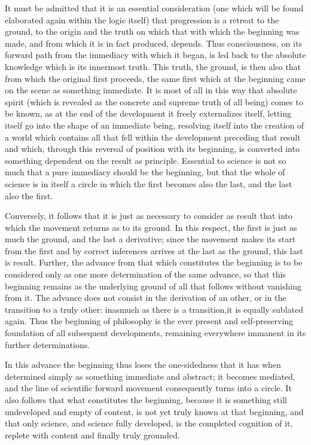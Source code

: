 It must be admitted that it is an essential consideration
(one which will be found elaborated again within the logic itself)
that progression is a retreat to the ground,
to the origin and the truth on which
that with which the beginning was made,
and from which it is in fact produced, depends.
Thus consciousness, on its forward path from
the immediacy with which it began,
is led back to the absolute knowledge
which is its innermost truth.
This truth, the ground, is then also
that from which the original first proceeds,
the same first which at the beginning
came on the scene as something immediate.
It is most of all in this way that absolute spirit
(which is revealed as the concrete and supreme truth of all being)
comes to be known, as at the end of the development
it freely externalizes itself,
letting itself go into the shape of an immediate being,
resolving itself into the creation of a world
which contains all that fell within the development
preceding that result and which,
through this reversal of position with its beginning,
is converted into something dependent on the result as principle.
Essential to science is not so much that
a pure immediacy should be the beginning,
but that the whole of science is in itself a circle
in which the first becomes also the last,
and the last also the first.

Conversely, it follows that it is
just as necessary to consider as result
that into which the movement returns as to its ground.
In this respect, the first is just as much the ground,
and the last a derivative;
since the movement makes its start from the first
and by correct inferences arrives at the last
as the ground, this last is result.
Further, the advance from that which constitutes the beginning is
to be considered only as one more determination of the same advance,
so that this beginning remains as the underlying ground of
all that follows without vanishing from it.
The advance does not consist in the derivation of an other,
or in the transition to a truly other:
inasmuch as there is a transition,it is equally sublated again.
Thus the beginning of philosophy is the ever present
and self-preserving foundation of all subsequent developments,
remaining everywhere immanent in its further determinations.

In this advance the beginning thus loses the one-sidedness
that it has when determined simply as something immediate and abstract;
it becomes mediated, and the line of scientific forward movement
consequently turns into a circle.
It also follows that what constitutes the beginning,
because it is something still undeveloped and empty of content,
is not yet truly known at that beginning,
and that only science, and science fully developed,
is the completed cognition of it,
replete with content and finally truly grounded.

